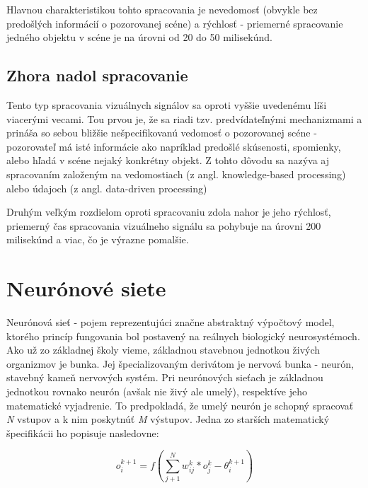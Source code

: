 Hlavnou charakteristikou tohto spracovania je nevedomosť (obvykle bez predošlých informácií o pozorovanej scéne) a rýchlosť - priemerné spracovanie jedného objektu v scéne je na úrovni od 20 do 50 milisekúnd\cite{itti2001computational}.


\subsection{Zhora nadol spracovanie}
Tento typ spracovania vizuálnych signálov sa oproti vyššie uvedenému líši viacerými vecami. Tou prvou je, že sa riadi tzv. predvídateľnými mechanizmami a prináša so sebou bližšie nešpecifikovanú vedomosť o pozorovanej scéne - pozorovateľ má isté informácie ako napríklad predošlé skúsenosti, spomienky, alebo hľadá v scéne nejaký konkrétny objekt. Z tohto dôvodu sa nazýva aj spracovaním založeným na vedomostiach (z angl. knowledge-based processing\cite{goldstein2008blackwell}) alebo údajoch (z angl. data-driven processing\cite{gregory1974concepts})

Druhým veľkým rozdielom oproti spracovaniu zdola nahor je jeho rýchlosť, priemerný čas spracovania vizuálneho signálu sa pohybuje na úrovni 200 milisekúnd\cite{itti2001computational} a viac, čo je výrazne pomalšie.



\newpage

\section{Neurónové siete}
\label{nn}

Neurónová sieť - pojem reprezentujúci značne abstraktný výpočtový model, ktorého princíp fungovania bol postavený na reálnych biologický neurosystémoch. Ako už zo základnej školy vieme, základnou stavebnou jednotkou živých organizmov je bunka. Jej špecializovaným derivátom je nervová bunka - neurón, stavebný kameň nervových systém. Pri neurónových sieťach je základnou jednotkou rovnako neurón (avšak nie živý ale umelý), respektíve jeho matematické vyjadrenie. To predpokladá, že umelý neurón je schopný spracovať \textit{N} vstupov a k nim poskytnúť \textit{M} výstupov. Jedna zo starších matematický špecifikácii ho popisuje nasledovne:

	\begin{equation}
		o_i ^{k+1} = f\left ( \sum_{j+1}^{N} w_{ij}^{k} * o_j^k - \theta_i^{k+1}  \right )
	\end{equation}
	
